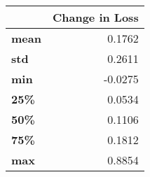 \begin{tabular}{lr}
\toprule
{} &  Change in Loss \\
\midrule
\textbf{mean} &          0.1762 \\
\textbf{std } &          0.2611 \\
\textbf{min } &         -0.0275 \\
\textbf{25\% } &          0.0534 \\
\textbf{50\% } &          0.1106 \\
\textbf{75\% } &          0.1812 \\
\textbf{max } &          0.8854 \\
\bottomrule
\end{tabular}
